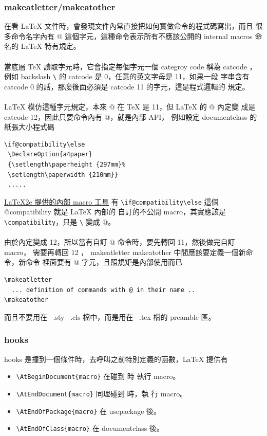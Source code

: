     \subsubsection{makeatletter/makeatother}
    在看 \LaTeX{} 文件時，會發現文件內常直接把如何實做命令的程式碼寫出，而且
    很多命令名字內有 @ 這個字元，這種命令表示所有不應該公開的 internal macros
    命名的 \LaTeX{} 特有規定。
    \\\\
    當底層 \TeX{} 讀取字元時，它會指定每個字元一個 categroy code 稱為 catcode
    ，例如 backslash \verb=\= 的 catcode 是 0，任意的英文字母是 11，如果一段
    字串含有 catcode 0 的話，那麼後面必須是 catcode 11 的字元，這是程式邏輯的
    規定。
    \\\\
    \LaTeX{} 模仿這種字元規定，本來 @ 在 \TeX{} 是 11，但 \LaTeX{} 的 @ 內定變
    成是 catcode 12，因此只要命令內有 @，就是內部 API， 例如設定 documentclass
    的紙張大小程式碼
    \begin{verbatim}
\if@compatibility\else
 \DeclareOption{a4paper}
 {\setlength\paperheight {297mm}%
 \setlength\paperwidth {210mm}}
 .....
    \end{verbatim}
    \href{https://texdoc.org/serve/macro2e/0}{\LaTeX{}2e 提供的內部 macro 工具}
    有 \verb=\if@compatibility\else= 這個 @compatibility 就是 \LaTeX{} 內部的
    自訂的不公開 macro，其實應該是 \verb=\compatibility=，只是 \verb=\= 變成
    @。
    \\\\
    由於內定變成 12，所以當有自訂 @ 命令時，要先轉回 11，然後做完自訂 macro，
    需要再轉回 12 ， makeatletter makeatother 中間應該要定義一個新命令，新命令
    裡面要有 @ 字元，且照規矩是內部使用而已
    \begin{verbatim}
\makeatletter
  ... definition of commands with @ in their name ..
\makeatother
    \end{verbatim}
    而且不要用在~ .sty ~.cls 檔中，而是用在~ .tex 檔的 preamble 區。

    \subsubsection{hooks}
    hooks 是撞到一個條件時，去呼叫之前特別定義的函數，\LaTeX{} 提供有
    \begin{itemize}
      \item \verb=\AtBeginDocument{macro}= 在碰到 \verb== 時
        執行 macro。
      \item \verb=\AtEndDocument{macro}= 同理碰到 \verb== 時，執
        行 macro。
      \item \verb=\AtEndOfPackage{macro}= 在 usepackage 後。
      \item \verb=\AtEndOfClass{macro}= 在 documentclass 後。
    \end{itemize}

